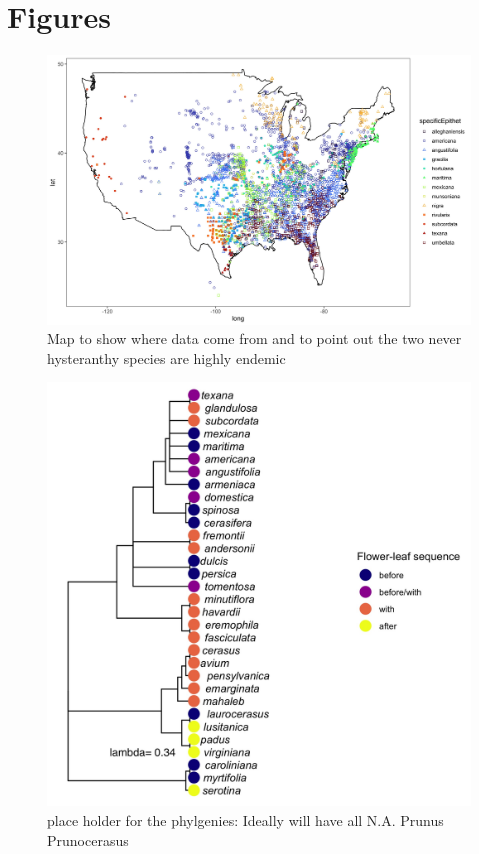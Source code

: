 \documentclass{article}\usepackage[]{graphicx}\usepackage[]{color}
\begin{document}
\section*{Figures}
    \begin{figure}[h!]
    \centering
 \includegraphics[width=\textwidth]{..//..//Plots/map.jpeg}
    \caption{Map to show where data come from and to point out the two never hysteranthy species are highly endemic}
    \label{fig:mappy}
\end{figure}

\begin{figure}[h!]
    \centering
 \includegraphics[width=\textwidth]{..//..//Plots/phylosig1.jpeg}
    \caption{place holder for the phylgenies: Ideally will have all N.A. Prunus  Prunocerasus }
    \label{fig:phylo1}
\end{figure}
\end{document}
